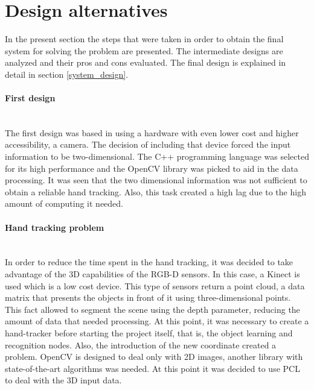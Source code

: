 \section{Design alternatives}
In the present section the steps that were taken in order to obtain the final system for solving the problem are presented. 
The intermediate designs are analyzed and their pros and cons evaluated. 
The final design is explained in detail in section \ref{system_design}.
\\

\paragraph{First design}
\mbox{} \\

The first design was based in using a hardware with even lower cost and higher accessibility, a camera. The decision of including that device forced the input information to be two-dimensional. The C++ programming language was selected for its high performance and the OpenCV library was picked to aid in the data processing. It was seen that the two dimensional information was not sufficient to obtain a reliable hand tracking. Also, this task created a high lag due to the high amount of computing it needed. 
\\


\paragraph{Hand tracking problem}
\mbox{} \\

In order to reduce the time spent in the hand tracking, it was decided to take advantage of the 3D capabilities of the RGB-D sensors. 
In this case, a Kinect is used which is a low cost device. 
This type of sensors return a point cloud, a data matrix that presents the objects in front of it using three-dimensional points. 
This fact allowed to segment the scene using the depth parameter, reducing the amount of data that needed processing. 
At this point, it was necessary to create a hand-tracker before starting the project itself, that is, the object learning and recognition nodes. 
Also, the introduction of the new coordinate created a problem. OpenCV is designed to deal only with 2D images, another library with state-of-the-art algorithms was needed. At this point it was decided to use PCL to deal with the 3D input data. 
\\


